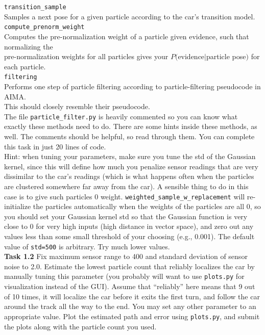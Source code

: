 \documentclass[a4paper]{article}
\begin{document}
\indent \texttt{transition\_sample}\\
\indent Samples a next pose for a given particle according to the car's transition model.\\

\indent \texttt{compute\_prenorm\_weight}\\
\indent Computes the pre-normalization weight of a particle given evidence, such that normalizing the\\
\indent pre-normalization weights for all particles gives your $P($evidence$\mid$particle pose$)$ for each particle.\\

\indent \texttt{filtering}\\
\indent Performs one step of particle filtering according to particle-filtering pseudocode in AIMA.\\
\indent This should closely resemble their pseudocode.\\

\noindent The file \texttt{particle\_filter.py} is heavily commented so you can know what exactly these methods need to do. There are some hints inside these methods, as well. The comments should be helpful, so read through them. You can complete this task in just 20 lines of code.\\

\noindent
Hint: when tuning your parameters, make sure you tune the std of the Gaussian kernel, since this will define how much you penalize sensor readings that are very dissimilar to the car's readings (which is what happens often when the particles are clustered somewhere far away from the car). A sensible thing to do in this case is to give such particles 0 weight. \texttt{weighted\_sample\_w\_replacement} will re-initialize the particles automatically when the weights of the particles are all 0, so you should set your Gaussian kernel std so that the Gaussian function is very close to 0 for very high inputs (high distance in vector space), and zero out any values less than some small threshold of your choosing (e.g., 0.001). The default value of \texttt{std=500} is arbitrary. Try much lower values.\\

\noindent
\textbf{Task 1.2} Fix maximum sensor range to 400 and standard deviation of sensor noise to 2.0. Estimate the lowest particle count that reliably localizes the car by manually tuning this parameter (you probably will want to use \texttt{plots.py} for visualization instead of the GUI). Assume that ``reliably'' here means that 9 out of 10 times, it will localize the car before it exits the first turn, and follow the car around the track all the way to the end. You may set any other parameter to an appropriate value. Plot the estimated path and error using \texttt{plots.py}, and submit the plots along with the particle count you used.\\
\end{document}
